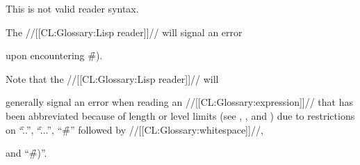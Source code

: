 This is not valid reader syntax.

The //[[CL:Glossary:Lisp reader]]// will signal an error   

upon encountering \f{\#)}.

\endsubsubsection%

\endsubsection%

   

Note that the //[[CL:Glossary:Lisp reader]]// will 

generally signal an error  when reading an //[[CL:Glossary:expression]]// that has been abbreviated because of length or level limits  (see ,
     ,
 and ) due to restrictions on ``\f{..}'', ``\f{...}'', ``\f{\#}'' followed by //[[CL:Glossary:whitespace]]//,

and ``\f{\#)}''.

\endsubsection%
